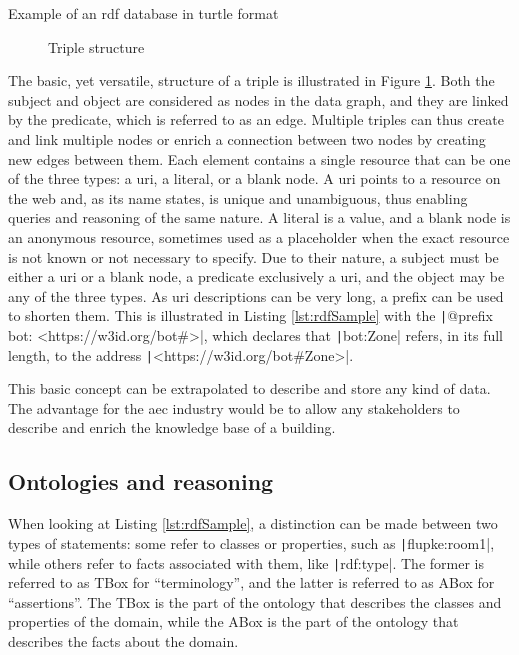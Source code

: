 \begin{listing}[hp]
	\inputminted{turtle}{figures/snippets/rdfSample.ttl}
	\vspace{-0.7cm}
	\caption{Example of an \acs{rdf} database in turtle format}
	\label{lst:rdfSample}
\end{listing}

\begin{figure}
	\centering
	
	\caption{Triple structure}
	\label{fig:triple}
\end{figure}

The basic, yet versatile, structure of a triple is illustrated in Figure \ref{fig:triple}. Both the subject and object are considered as nodes in the data graph, and they are linked by the predicate, which is referred to as an edge. Multiple triples can thus create and link multiple nodes or enrich a connection between two nodes by creating new edges between them. Each element contains a single resource that can be one of the three types: a \acs{uri}, a literal, or a blank node. A \ac{uri} points to a resource on the web and, as its name states, is unique and unambiguous, thus enabling queries and reasoning of the same nature. A literal is a value, and a blank node is an anonymous resource, sometimes used as a placeholder when the exact resource is not known or not necessary to specify. Due to their nature, a subject must be either a \ac{uri} or a blank node, a predicate exclusively a \ac{uri}, and the object may be any of the three types. As \ac{uri} descriptions can be very long, a prefix can be used to shorten them. This is illustrated in Listing \ref{lst:rdfSample} with the \texttt|@prefix bot: <https://w3id.org/bot#>|, which declares that \texttt|bot:Zone| refers, in its full length, to the address \texttt|<https://w3id.org/bot#Zone>|.

This basic concept can be extrapolated to describe and store any kind of data. The advantage for the \ac{aec} industry would be to allow any stakeholders to describe and enrich the knowledge base of a building.

\subsection{Ontologies and reasoning}\label{subsec:ontologies}
When looking at Listing \ref{lst:rdfSample}, a distinction can be made between two types of statements: some refer to classes or properties, such as \texttt|flupke:room1|, while others refer to facts associated with them, like \texttt|rdf:type|. The former is referred to as TBox for \enquote{terminology}, and the latter is referred to as ABox for \enquote{assertions}. The TBox is the part of the ontology that describes the classes and properties of the domain, while the ABox is the part of the ontology that describes the facts about the domain.

